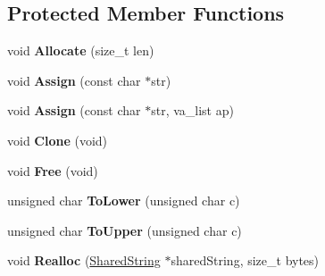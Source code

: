 \subsection*{Protected Member Functions}
\begin{DoxyCompactItemize}
\item 
\hypertarget{class_rak_net_1_1_rak_string_a7b59a1b3fb27aa37a5de038e39228713}{void {\bfseries Allocate} (size\-\_\-t len)}\label{class_rak_net_1_1_rak_string_a7b59a1b3fb27aa37a5de038e39228713}

\item 
\hypertarget{class_rak_net_1_1_rak_string_ae31dd059a3f27fbc16f31745d345981c}{void {\bfseries Assign} (const char $\ast$str)}\label{class_rak_net_1_1_rak_string_ae31dd059a3f27fbc16f31745d345981c}

\item 
\hypertarget{class_rak_net_1_1_rak_string_a4c151bcb146592ee181a7e820d208f1e}{void {\bfseries Assign} (const char $\ast$str, va\-\_\-list ap)}\label{class_rak_net_1_1_rak_string_a4c151bcb146592ee181a7e820d208f1e}

\item 
\hypertarget{class_rak_net_1_1_rak_string_ad62640a55f99932220d819dc1d77e5d8}{void {\bfseries Clone} (void)}\label{class_rak_net_1_1_rak_string_ad62640a55f99932220d819dc1d77e5d8}

\item 
\hypertarget{class_rak_net_1_1_rak_string_a04942db5fa939047c355eaa8673035d5}{void {\bfseries Free} (void)}\label{class_rak_net_1_1_rak_string_a04942db5fa939047c355eaa8673035d5}

\item 
\hypertarget{class_rak_net_1_1_rak_string_a55de1d994815a8f00a431fdd6874d805}{unsigned char {\bfseries To\-Lower} (unsigned char c)}\label{class_rak_net_1_1_rak_string_a55de1d994815a8f00a431fdd6874d805}

\item 
\hypertarget{class_rak_net_1_1_rak_string_a7ca379b709c787e6b58d0a0e800d3119}{unsigned char {\bfseries To\-Upper} (unsigned char c)}\label{class_rak_net_1_1_rak_string_a7ca379b709c787e6b58d0a0e800d3119}

\item 
\hypertarget{class_rak_net_1_1_rak_string_a46d4ddb3e5cd9d7083980a81002095e9}{void {\bfseries Realloc} (\hyperlink{struct_rak_net_1_1_rak_string_1_1_shared_string}{Shared\-String} $\ast$shared\-String, size\-\_\-t bytes)}\label{class_rak_net_1_1_rak_string_a46d4ddb3e5cd9d7083980a81002095e9}

\end{DoxyCompactItemize}
